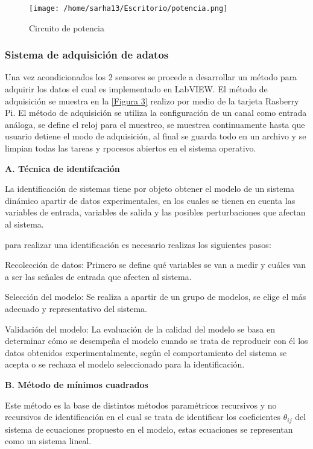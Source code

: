 \documentclass[letter,operight,12pt,spanish]{report}
\begin{document}
\begin{figure}[htp]
\centering
\texttt{[image: /home/sarha13/Escritorio/potencia.png]}
\caption{Circuito de potencia}
\label{}
\end{figure}
 
 \subsubsection{Sistema de adquisici\'on de adatos}

Una vez acondicionados los 2 sensores se procede a desarrollar un m\'etodo para adquirir los datos el cual es implementado en LabVIEW. El m\'etodo de adquisici\'on se muestra en la \ref{Figura 3} realizo por medio de la tarjeta Rasberry Pi. El m\'etodo de adquisici\'on se utiliza la configuraci\'on de un canal como entrada an\'aloga, se define el reloj para el muestreo, se muestrea continuamente hasta que usuario detiene el modo de adquisici\'on, al final se guarda todo en un archivo y se limpian todas las tareas y rpocesos abiertos en el sistema operativo.

\textbf{A. T\'ecnica de identifcaci\'on}

La identificaci\'on de sistemas tiene por objeto obtener el modelo de un sistema din\'amico apartir de datos experimentales, en los cuales se tienen en cuenta las variables de entrada, variables de salida y las posibles perturbaciones que afectan al sistema.

para realizar una identificaci\'on es necesario realizas los siguientes pasos:

Recolecci\'on de datos: Primero se define qu\'e variables se van a medir y cu\'ales van a ser las se\~nales de entrada que afecten al sistema.

Selecci\'on del modelo: Se realiza a apartir de un grupo de modelos, se elige el m\'as adecuado y representativo del sistema.

Validaci\'on del modelo: La evaluaci\'on de la calidad del modelo se basa en determinar c\'omo se desempe\~na el modelo cuando se trata de reproducir con \'el los datos obtenidos experimentalmente, seg\'un el comportamiento del sistema se acepta o se rechaza el modelo seleccionado para la identificaci\'on.

\textbf{B. M\'etodo de m\'inimos cuadrados}

Este m\'etodo es la base de distintos m\'etodos param\'etricos recursivos y no recursivos de identificaci\'on en el cual se trata de identificar los coeficientes $\theta_{ij}$ del sistema de ecuaciones propuesto en el modelo, estas ecuaciones se representan como un sistema lineal.
\end{document}

